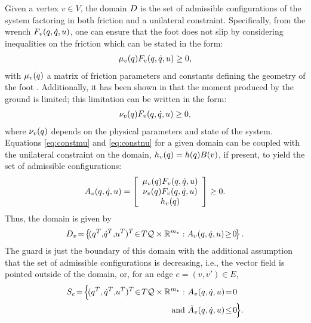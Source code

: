 Given a vertex $v \in V$, the domain $D$ is the set of admissible configurations of the system factoring in both friction and a unilateral constraint.
%
Specifically, from the wrench $F_{v}(q, \dot{q}, u)$, one can ensure that the foot does not slip by considering inequalities on the friction which can be stated in the form:
%
\begin{align}
  \label{eq:constmu}
  \mu_{v}(q) F_{v}(q, \dot{q}, u) \geq 0,
\end{align}
%
with $\mu_{v}(q)$ a matrix of friction parameters and constants defining the geometry of the foot \cite{GCAS10}.
%
Additionally, it has been shown in \cite{CBAA09,VBSS90} that the moment produced by the ground is limited; this limitation can be written in the form:
%
\begin{align}
  \label{eq:constnu}
  \nu_{v}(q) F_{v}(q, \dot{q}, u) \geq 0,
\end{align}
%
where $\nu_{v}(q)$ depends on the physical parameters and state of the system.
%
Equations \eqref{eq:constmu} and \eqref{eq:constnu} for a given domain can be coupled with the unilateral constraint on the domain, $h_{v}(q) = h(q) B(v)$, if present, to yield the set of admissible configurations:
%
\begin{align}
  \label{admissible}
  A_{v}(q, \dot{q}, u) = \left[ \begin{array}{c}
      \mu_{v}(q) F_{v}(q, \dot{q}, u)\\
      \nu_{v}(q) F_{v}(q, \dot{q}, u)\\
      h_{v}(q)
    \end{array} \right] \geq 0.
\end{align}
%
Thus, the domain is given by
%
\begin{align}
  \label{eq:domain}
  \D_{v} \! = \! \left\{ \! (q^{T}, \! {\dot q}^{T}, \! \u^{T})^{T} \! \in \! T\Q \times \R^{m_{v}} : A_{v}\argsqdqu \! \geq \! 0 \! \right\}.
\end{align}
%
The guard is just the boundary of this domain with the additional assumption that the set of admissible configurations is decreasing, i.e., the vector field is pointed outside of the domain, or, for an edge $e = (v, v') \in E$,
%
\begin{align}
  S_{e} \! = \! \Bigl\{ \!(\q^{T}, \dq^{T}, \! \u^{T})^{T} \! \in \! T\Q \times \R^{m_v} : \ &A_{v}\argsqdqu \! = \! 0 \\
  \nonumber
  \mathrm{and} \ &{\dot A}_{v}\argsqdqu \! \leq \! 0 \! \Bigl\}.
\end{align}

